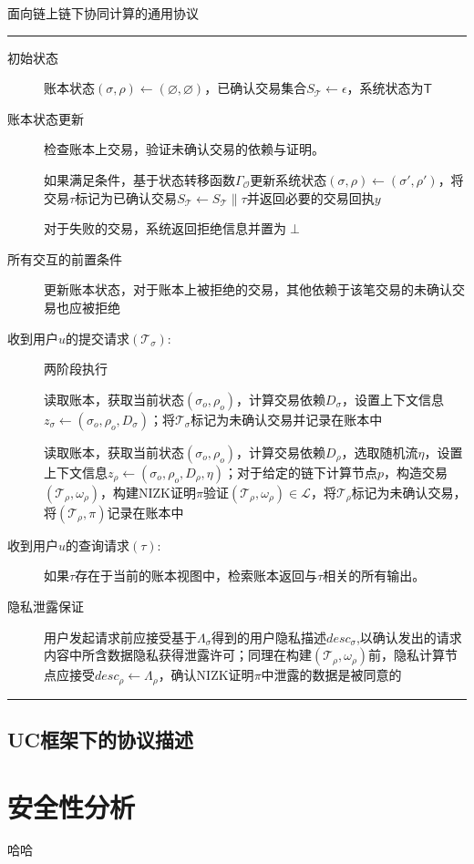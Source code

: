 \begin{center}
    面向链上链下协同计算的通用协议
\end{center}
\noindent\hrule
\begin{description}
    \item[初始状态] 账本状态$(\sigma, \rho) \leftarrow (\varnothing, \varnothing)$，已确认交易集合$S_\mathcal{T} \leftarrow \epsilon$，系统状态为$\mathsf{T}$
    
    \item[账本状态更新] 检查账本上交易，验证未确认交易的依赖与证明。
    
    如果满足条件，基于状态转移函数$\Gamma_{\mathcal{O}}$更新系统状态$(\sigma, \rho) \leftarrow (\sigma', \rho')$，将交易$\tau$标记为已确认交易$S_\mathcal{T} \leftarrow S_\mathcal{T}\parallel\tau$并返回必要的交易回执$y$

    对于失败的交易，系统返回拒绝信息并置为$\perp$

    \item[所有交互的前置条件] 更新账本状态，对于账本上被拒绝的交易，其他依赖于该笔交易的未确认交易也应被拒绝

    \item[收到用户$u$的提交请求$(\mathcal{T}_\sigma)$:] 两阶段执行
    
    \subitem [stage 1] 读取账本，获取当前状态$(\sigma_o, \rho_o)$，计算交易依赖$D_\sigma$，设置上下文信息$z_\sigma \leftarrow (\sigma_o, \rho_o, D_\sigma)$；将$\mathcal{T}_\sigma$标记为未确认交易并记录在账本中
    
    \subitem [stage 2] 读取账本，获取当前状态$(\sigma_o, \rho_o)$，计算交易依赖$D_\rho$，选取随机流$\eta$，设置上下文信息$z_\rho \leftarrow (\sigma_o, \rho_o, D_\rho, \eta)$；对于给定的链下计算节点$\mathit{p}$，构造交易$(\mathcal{T}_\rho, \omega_\rho)$，构建NIZK证明$\pi$验证$(\mathcal{T}_\rho, \omega_\rho) \in \mathcal{L}$，将$\mathcal{T}_\rho$标记为未确认交易，将$(\mathcal{T}_\rho, \pi)$记录在账本中

    \item[收到用户$u$的查询请求$(\tau)$:] 如果$\tau$存在于当前的账本视图中，检索账本返回与$\tau$相关的所有输出。
    
    \item[隐私泄露保证] 用户发起请求前应接受基于$\Lambda_\sigma$得到的用户隐私描述$desc_\sigma$,以确认发出的请求内容中所含数据隐私获得泄露许可；同理在构建$(\mathcal{T}_\rho, \omega_\rho)$前，隐私计算节点应接受$desc_\rho \leftarrow \Lambda_\rho$，确认NIZK证明$\pi$中泄露的数据是被同意的
\end{description}
\noindent\hrule

\subsection{UC框架下的协议描述}

\section{安全性分析}
哈哈